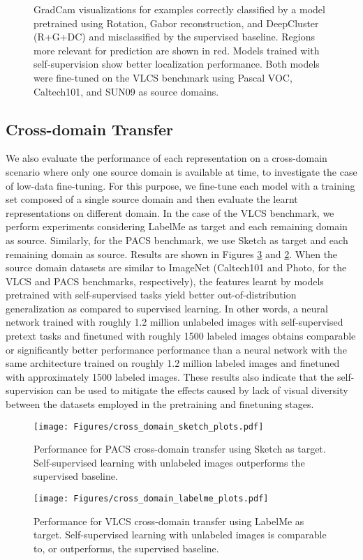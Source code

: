 \documentclass[runningheads]{llncs}
\begin{document}
\begin{figure}[h]
\begin{tabular}{ccccccccc}
\end{tabular}
\caption{GradCam visualizations for examples {correctly} classified by a model pretrained using Rotation, Gabor reconstruction, and DeepCluster (R+G+DC) and {misclassified} by the supervised baseline. Regions more relevant for prediction are shown in red. Models trained with self-supervision show better localization performance. Both models were fine-tuned on the VLCS benchmark using Pascal VOC, Caltech101, and SUN09 as source domains. }
\label{fig:gradcam_vlcs}
\end{figure}

\subsection{Cross-domain Transfer}
We also evaluate the performance of each representation on a cross-domain scenario where only one source domain is available at time, to investigate the case of low-data fine-tuning. For this purpose, we fine-tune each model with a training set composed of a single source domain and then evaluate the learnt representations on different domain. In the case of the VLCS benchmark, we perform experiments considering LabelMe as target and each remaining domain as source. Similarly, for the PACS benchmark, we use Sketch as target and each remaining domain as source. Results are shown in Figures \ref{fig:cross_labelme} and  \ref{fig:cross_sketch}. When the source domain datasets are similar to ImageNet (Caltech101 and Photo, for the VLCS and PACS benchmarks, respectively), the features learnt by models pretrained with self-supervised tasks yield better out-of-distribution generalization as compared to supervised learning. In other words, a neural network trained with roughly 1.2 million {unlabeled} images with self-supervised pretext tasks and finetuned with roughly 1500 labeled images obtains comparable or significantly better performance performance than a neural network with the same architecture trained on roughly 1.2 million {labeled} images and finetuned with approximately 1500 labeled images. These results also indicate that the self-supervision can be used to mitigate the effects caused by lack of visual diversity between the datasets employed in the pretraining and finetuning stages. 



\begin{figure}[t]
    \centering
    \texttt{[image: Figures/cross\_domain\_sketch\_plots.pdf]}
    \caption{Performance for PACS cross-domain transfer using Sketch as target. Self-supervised learning with unlabeled images outperforms the supervised baseline.} \label{fig:cross_sketch}
\end{figure}
\begin{figure}[t]
    \centering
    \texttt{[image: Figures/cross\_domain\_labelme\_plots.pdf]}
    \caption{Performance for VLCS cross-domain transfer using LabelMe as target. Self-supervised learning with unlabeled images is comparable to, or outperforms, the supervised baseline.}
    \label{fig:cross_labelme}
\end{figure}
\end{document}
